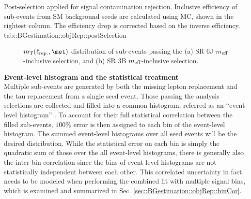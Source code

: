 
{Post-selection applied for signal contamination rejection. Inclusive efficiency of sub-events from SM background seeds are calculated using MC, shown in the rightest column. The efficiency drop is corrected based on the inverse efficiency.}
{tab::BGestimation::objRep::postSelection}


\begin{figure}[h]
  \centering
 \caption{ 
   $\mtRep$ distribution of sub-events passing the (a) SR 6J $m_{\mathrm{eff}}$-inclusive selection, and (b) SR 3B $m_{\mathrm{eff}}$-inclusive selection. 
   \label{fig::BGestimation::objRep::mtRep} 
 }
\end{figure}

\noindent \textbf{Event-level histogram and the statistical treatment} \\
Multiple sub-events are generated by both the missing lepton replacement and the tau replacement from a single seed event. Those passing the analysis selections are collected and filled into a common histogram, referred as an ``event-level histogram'' 
. To account for their full statistical correlation between the filled sub-events, $100\%$ error is then assigned to each bin of the event-level histogram. 
The summed event-level histograms over all seed events will be the desired distribution. While the statistical error on each bin is simply the quadratic sum of those over the all event-level histograms, there is generally also the inter-bin correlation since the bins of event-level histograms are not statistically independent between each other. This correlated uncertainty in fact needs to be modeled when performing the combined fit with multiple signal bins, which is examined and summarized in Sec. \ref{sec::BGestimation::objRep::binCor}.


